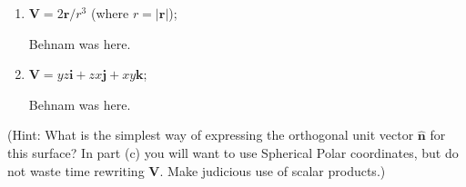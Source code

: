\documentclass[fleqn]{article}
\begin{document}
\begin{enumerate}
\begin{enumerate}
        \item $\mathbf{V}=2 \mathbf{r}/r^3$ (where $r=|\mathbf{r}|$);

          \textcolor{hwColor}{
            Behnam was here.
          }
        
        \item $\mathbf{V}=yz\mathbf{i}+zx\mathbf{j}+xy\mathbf{k}$;

          \textcolor{hwColor}{
            Behnam was here.
          }

      \end{enumerate}
      (Hint: What is the simplest way of expressing the orthogonal unit vector $\mathbf{\hat n}$ for this surface? In part (c) you will want to use Spherical Polar coordinates, but do not waste time rewriting $\mathbf{V}$. Make judicious use of scalar products.)

  \end{enumerate}

  \pagebreak
\end{document}
